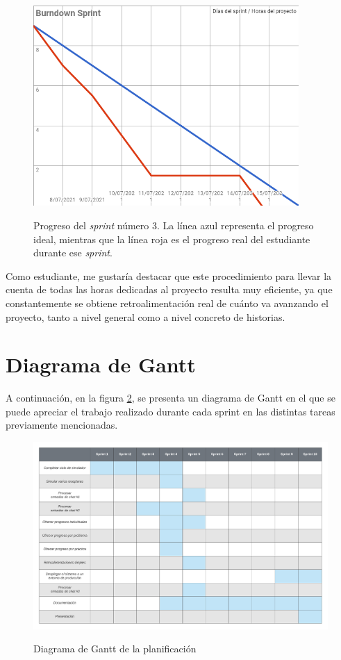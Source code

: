 \begin{figure}[h]
\centering
\includegraphics[width=0.9\textwidth]{logos/sprint4.png}\\[1.4cm]
\caption{Progreso del \textit{sprint} número 3. La línea azul representa el progreso ideal, mientras que la línea roja es el progreso real del estudiante durante ese \textit{sprint}.}
\label{img:sprint3}
\end{figure}

Como estudiante, me gustaría destacar que este procedimiento para llevar la cuenta de todas las horas dedicadas al proyecto resulta muy eficiente, ya que constantemente se obtiene retroalimentación real de cuánto va avanzando el proyecto, tanto a nivel general como a nivel concreto de historias.

\section{Diagrama de Gantt}

A continuación, en la figura \ref{img:gantt}, se presenta un diagrama de Gantt en el que se puede apreciar el trabajo realizado durante cada sprint en las distintas tareas previamente mencionadas.

\begin{figure}[h]
\centering
\includegraphics[width=1.1\textwidth]{logos/gantt.png}\\[1.4cm]
\caption{Diagrama de Gantt de la planificación}
\label{img:gantt}
\end{figure}

